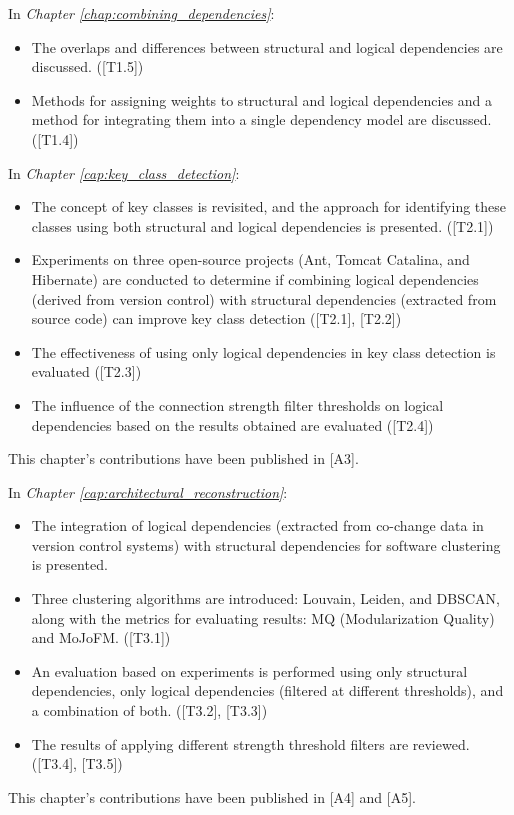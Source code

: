 \noindent In \textit{Chapter \ref{chap:combining_dependencies}}:
\begin{itemize}
    \item The overlaps and differences between structural and logical dependencies are discussed. \hfill ([T1.5])
    \item Methods for assigning weights to structural and logical dependencies and a method for integrating them into a single dependency model are discussed.  \hfill ([T1.4])
\end{itemize}

\noindent In \textit{Chapter \ref{cap:key_class_detection}}:
\begin{itemize}
    \item The concept of key classes is revisited, and the approach for identifying these classes using both structural and logical dependencies is presented. \hfill  ([T2.1])
    \item Experiments on three open-source projects (Ant, Tomcat Catalina, and Hibernate) are conducted to determine if combining logical dependencies (derived from version control) with structural dependencies (extracted from source code) can improve key class detection \hfill ([T2.1], [T2.2])
    \item The effectiveness of using only logical dependencies in key class detection is evaluated \hfill ([T2.3])
    \item The influence of the connection strength filter thresholds on logical dependencies based on the results obtained are evaluated \hfill ([T2.4])
\end{itemize}
This chapter's contributions have been published in [A3].


\noindent In \textit{Chapter \ref{cap:architectural_reconstruction}}:
\begin{itemize}
    \item The integration of logical dependencies (extracted from co-change data in version control systems) with structural dependencies for software clustering is presented. 
    \item Three clustering algorithms are introduced: Louvain, Leiden, and DBSCAN, along with the metrics for evaluating results: MQ (Modularization Quality) and MoJoFM. \hfill ([T3.1])
    \item An evaluation based on experiments is performed using only structural dependencies, only logical dependencies (filtered at different thresholds), and a combination of both. \hfill ([T3.2], [T3.3])
    \item The results of applying different strength threshold filters are reviewed. \hfill ([T3.4], [T3.5])
\end{itemize}
This chapter's contributions have been published in [A4] and [A5].


